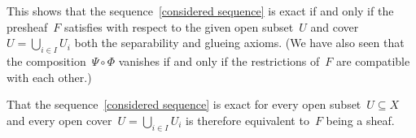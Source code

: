 This shows that the sequence~\eqref{considered sequence} is exact if and only if the presheaf~$F$ satisfies with respect to the given open subset~$U$ and cover~$U = \bigcup_{i \in I} U_i$ both the separability and glueing axioms.
(We have also seen that the composition~$\Psi \circ \Phi$ vanishes if and only if the restrictions of~$F$ are compatible with each other.)

That the sequence~\eqref{considered sequence} is exact for every open subset~$U \subseteq X$ and every open cover~$U = \bigcup_{i \in I} U_i$ is therefore equivalent to~$F$ being a sheaf.




